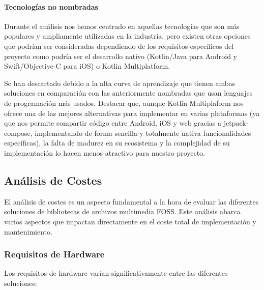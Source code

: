 \paragraph{Tecnologías no nombradas}
Durante el análisis nos hemos centrado en aquellas tecnologías que son más populares y ampliamente utilizadas en la industria, pero existen otras opciones que podrían ser consideradas dependiendo de los requisitos específicos del proyecto como podría ser el desarrollo nativo (Kotlin/Java para Android y Swift/Objective-C para iOS) o Kotlin Multiplatform.

Se han descartado debido a la alta curva de aprendizaje que tienen ambas soluciones en comparación con las anteriormente nombradas que usan lenguajes de programación más usados. Destacar que, aunque Kotlin Multiplaform nos ofrece una de las mejores alternativas para implementar en varias plataformas (ya que nos permite compartir código entre Android, iOS y web gracias a \gls{jetpack-compose}, implementando de forma sencilla y totalmente nativa funcionalidades específicas), la falta de madurez en su ecosistema y la complejidad de su implementación lo hacen menos atractivo para nuestro proyecto.

\subsection{Análisis de Costes}

El análisis de costes es un aspecto fundamental a la hora de evaluar las diferentes soluciones de bibliotecas de archivos multimedia FOSS. Este análisis abarca varios aspectos que impactan directamente en el coste total de implementación y mantenimiento.

\subsubsection{Requisitos de Hardware}

Los requisitos de hardware varían significativamente entre las diferentes soluciones:

